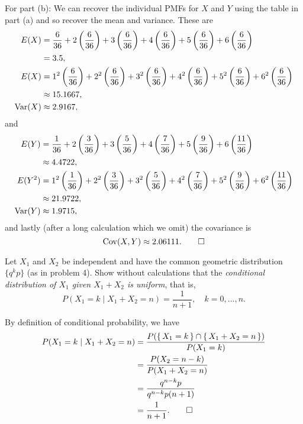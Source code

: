\begin{solution}
  For part (b): We can recover the individual PMFs for \(X\) and \(Y\)
  using the table in part (a) and so recover the mean and variance. These
  are
  \begin{align*}
    E(X)&=\frac{6}{36}%
          +2\left(\frac{6}{36}\right)%
          +3\left(\frac{6}{36}\right)%
          +4\left(\frac{6}{36}\right)%
          +5\left(\frac{6}{36}\right)%
          +6\left(\frac{6}{36}\right)\\
        &=3.5,\\
    E(X)&=1^2\left(\frac{6}{36}\right)%
          +2^2\left(\frac{6}{36}\right)%
          +3^2\left(\frac{6}{36}\right)%
          +4^2\left(\frac{6}{36}\right)%
          +5^2\left(\frac{6}{36}\right)%
          +6^2\left(\frac{6}{36}\right)\\
        &\approx15.1667,\\
    \Var(X)&\approx 2.9167,
  \end{align*}
  and
  \begin{align*}
    E(Y)&=\frac{1}{36}%
          +2\left(\frac{3}{36}\right)%
          +3\left(\frac{5}{36}\right)%
          +4\left(\frac{7}{36}\right)%
          +5\left(\frac{9}{36}\right)%
          +6\left(\frac{11}{36}\right)\\
        &\approx 4.4722,\\
    E(Y^2)&=1^2\left(\frac{1}{36}\right)%
            +2^2\left(\frac{3}{36}\right)%
            +3^2\left(\frac{5}{36}\right)%
            +4^2\left(\frac{7}{36}\right)%
            +5^2\left(\frac{9}{36}\right)%
            +6^2\left(\frac{11}{36}\right)\\
        &\approx 21.9722,\\
    \Var(Y)&\approx 1.9715,
  \end{align*}
  and lastly (after a long calculation which we omit) the covariance is
  \[
    \operatorname{Cov}(X,Y)\approx 2.06111.\qedhere
  \]
\end{solution}

\begin{problem}[Handout 15, \# 19]
  Let \(X_1\) and \(X_2\) be independent and have the common geometric
  distribution \(\{q^kp\}\) (as in problem 4). Show without calculations
  that the \emph{conditional distribution of \(X_1\) given \(X_1+X_2\) is
    uniform}, that is,
  \begin{equation}
    \label{eq:12:uniform-conditional-pmf}
    P(X_1=k\mid X_1+X_2=n)=\frac{1}{n+1},\quad k=0,\dotsc,n.
  \end{equation}
\end{problem}
\begin{solution}
  By definition of conditional probability, we have
  \begin{align*}
    P(X_1=k\mid X_1+X_2=n)
    &=\frac{P(\{\,X_1=k\,\}\cap\{\,X_1+X_2=n\,\})}{P(X_1=k)}\\
    &=\frac{P(X_2=n-k)}{P(X_1+X_2=n)}\\
    &=\frac{q^{n-k}p}{q^{n-k}p(n+1)}\\
    &=\frac{1}{n+1}.\qedhere
  \end{align*}
\end{solution}

